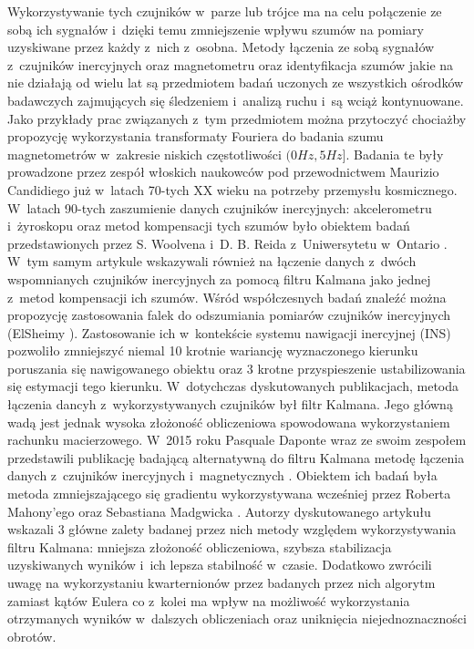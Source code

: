 Wykorzystywanie tych czujników w~parze lub trójce ma na celu połączenie ze sobą ich sygnałów i~dzięki temu zmniejszenie wpływu szumów na pomiary uzyskiwane przez każdy z~nich z~osobna. Metody łączenia ze sobą sygnałów z~czujników inercyjnych oraz magnetometru oraz identyfikacja szumów jakie na nie działają od wielu lat są przedmiotem badań uczonych ze wszystkich ośrodków badawczych zajmujących się śledzeniem i~analizą ruchu i~są wciąż kontynuowane. Jako przykłady prac związanych z~tym przedmiotem można przytoczyć chociażby propozycję wykorzystania transformaty Fouriera do badania szumu magnetometrów w~zakresie niskich częstotliwości $(0Hz, 5Hz]$. Badania te były prowadzone przez zespół włoskich naukowców pod przewodnictwem Maurizio Candidiego już w~latach 70-tych XX wieku \cite{Candidi1974} na potrzeby przemysłu kosmicznego. W~latach 90-tych zaszumienie danych czujników inercyjnych: akcelerometru i~żyroskopu oraz metod kompensacji tych szumów było obiektem badań przedstawionych przez S. Woolvena i~D. B. Reida z~Uniwersytetu w~Ontario \cite{Woolven1994}. W~tym samym artykule wskazywali również na łączenie danych z~dwóch wspomnianych czujników inercyjnych za pomocą filtru Kalmana jako jednej z~metod kompensacji ich szumów. Wśród współczesnych badań znaleźć można propozycję zastosowania falek do odszumiania pomiarów czujników inercyjnych (ElSheimy  \cite{ElSheimy2004}). Zastosowanie ich w~kontekście systemu nawigacji inercyjnej (INS) pozwoliło zmniejszyć niemal 10 krotnie wariancję wyznaczonego kierunku poruszania się nawigowanego obiektu oraz 3 krotne przyspieszenie ustabilizowania się estymacji tego kierunku. W~dotychczas dyskutowanych publikacjach, metoda łączenia dancyh z~wykorzystywanych czujników był filtr Kalmana. Jego główną wadą jest jednak wysoka złożoność obliczeniowa spowodowana wykorzystaniem rachunku macierzowego. W~2015 roku Pasquale Daponte wraz ze swoim zespołem przedstawili publikację badającą alternatywną do filtru Kalmana metodę łączenia danych z~czujników inercyjnych i~magnetycznych \cite{Daponte2015}. Obiektem ich badań była metoda zmniejszającego się gradientu wykorzystywana wcześniej przez Roberta Mahony'ego \cite{Mahony2005a} oraz Sebastiana Madgwicka \cite{Madgwick2011}. Autorzy dyskutowanego artykułu wskazali 3 główne zalety badanej przez nich metody względem wykorzystywania filtru Kalmana: mniejsza złożoność obliczeniowa, szybsza stabilizacja uzyskiwanych wyników i~ich lepsza stabilność w~czasie. Dodatkowo zwrócili uwagę na wykorzystaniu kwarternionów przez badanych przez nich algorytm zamiast kątów Eulera co z~kolei ma wpływ na możliwość wykorzystania otrzymanych wyników w~dalszych obliczeniach oraz uniknięcia niejednoznaczności obrotów. 
